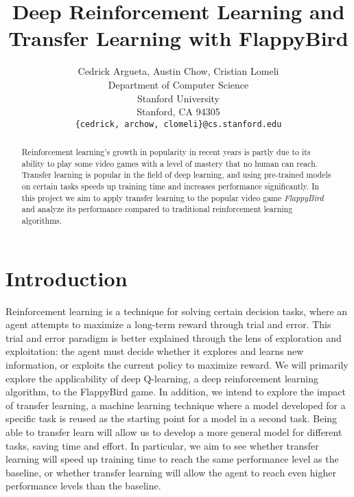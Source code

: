 \documentclass{article}
\title{Deep Reinforcement Learning and Transfer Learning with FlappyBird}
\author{
  Cedrick Argueta, Austin Chow, Cristian Lomeli \\
  Department of Computer Science\\
  Stanford University\\
  Stanford, CA 94305 \\
  \texttt{\{cedrick, archow, clomeli\}@cs.stanford.edu} \\
}
\begin{document}

\maketitle

\begin{abstract}

Reinforcement learning's growth in popularity in recent years is partly due to its ability to play some video games with a level of mastery that no human can reach. 
Transfer learning is popular in the field of deep learning, and using pre-trained models on certain tasks speeds up training time and increases performance significantly. 
In this project we aim to apply transfer learning to the popular video game \textit{FlappyBird} and analyze its performance compared to traditional reinforcement learning algorithms.
 
\end{abstract}


\section{Introduction}
Reinforcement learning is a technique for solving certain decision tasks, where an agent attempts to maximize a long-term reward through trial and error. 
This trial and error paradigm is better explained through the lens of exploration and exploitation: the agent must decide whether it explores and learns new information, or exploits the current policy to maximize reward.
We will primarily explore the applicability of deep Q-learning, a deep reinforcement learning algorithm, to the FlappyBird game.
In addition, we intend to explore the impact of transfer learning, a machine learning technique where a model developed for a specific task is reused as the starting point for a model in a second task. 
Being able to transfer learn will allow us to develop a more general model for different tasks, saving time and effort.
In particular, we aim to see whether transfer learning will speed up training time to reach the same performance level as the baseline, or whether transfer learning will allow the agent to reach even higher performance levels than the baseline.
\end{document}
